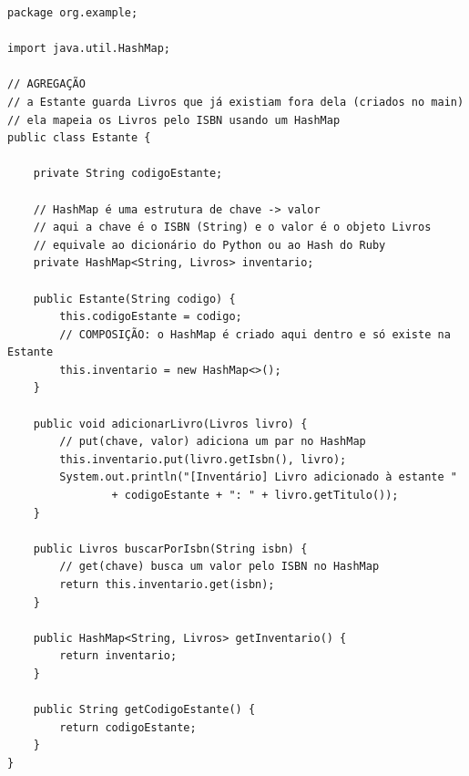 \begin{lstlisting}[style=java, caption={Exemplo de Aplicação de POO em Java: \texttt{Estante.java}}]
package org.example;

import java.util.HashMap;

// AGREGAÇÃO
// a Estante guarda Livros que já existiam fora dela (criados no main)
// ela mapeia os Livros pelo ISBN usando um HashMap
public class Estante {

    private String codigoEstante;

    // HashMap é uma estrutura de chave -> valor
    // aqui a chave é o ISBN (String) e o valor é o objeto Livros
    // equivale ao dicionário do Python ou ao Hash do Ruby
    private HashMap<String, Livros> inventario;

    public Estante(String codigo) {
        this.codigoEstante = codigo;
        // COMPOSIÇÃO: o HashMap é criado aqui dentro e só existe na Estante
        this.inventario = new HashMap<>();
    }

    public void adicionarLivro(Livros livro) {
        // put(chave, valor) adiciona um par no HashMap
        this.inventario.put(livro.getIsbn(), livro);
        System.out.println("[Inventário] Livro adicionado à estante "
                + codigoEstante + ": " + livro.getTitulo());
    }

    public Livros buscarPorIsbn(String isbn) {
        // get(chave) busca um valor pelo ISBN no HashMap
        return this.inventario.get(isbn);
    }

    public HashMap<String, Livros> getInventario() {
        return inventario;
    }

    public String getCodigoEstante() {
        return codigoEstante;
    }
}
\end{lstlisting}

